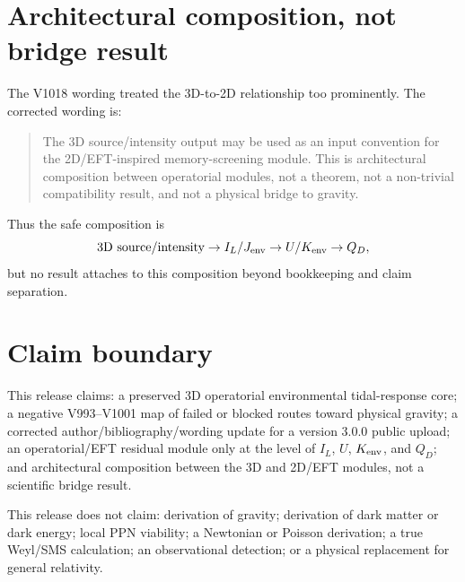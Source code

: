 \documentclass[11pt,a4paper]{article}
\begin{document}
\section{Architectural composition, not bridge result}
The V1018 wording treated the 3D-to-2D relationship too prominently. The corrected wording is:
\begin{quote}
The 3D source/intensity output may be used as an input convention for the 2D/EFT-inspired memory-screening module. This is architectural composition between operatorial modules, not a theorem, not a non-trivial compatibility result, and not a physical bridge to gravity.
\end{quote}
Thus the safe composition is
\[
\hbox{3D source/intensity} \rightarrow I_L/J_{\rm env} \rightarrow U/K_{\rm env} \rightarrow Q_D,
\]
but no result attaches to this composition beyond bookkeeping and claim separation.

\section{Claim boundary}
This release claims: a preserved 3D operatorial environmental tidal-response core; a negative V993--V1001 map of failed or blocked routes toward physical gravity; a corrected author/bibliography/wording update for a version 3.0.0 public upload; an operatorial/EFT residual module only at the level of $I_L$, $U$, $K_{\rm env}$, and $Q_D$; and architectural composition between the 3D and 2D/EFT modules, not a scientific bridge result.

This release does not claim: derivation of gravity; derivation of dark matter or dark energy; local PPN viability; a Newtonian or Poisson derivation; a true Weyl/SMS calculation; an observational detection; or a physical replacement for general relativity.
\end{document}
